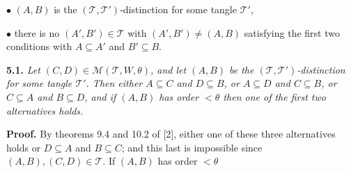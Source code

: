 \hspace*{12pt}$\bullet$ $(A, B)$ is the $(\mathcal{T}, \mathcal{T}')$-distinction for some tangle $\mathcal{T}'$,

\hspace*{12pt}$\bullet$ there is no $(A', B') \in \mathcal{T}$ with $(A', B') \ne (A, B)$ satisfying the first two conditions with $A \subseteq A'$ and $B' \subseteq B$.

\textbf{5.1.} \textit{Let $(C, D) \in \mathcal{M}(\mathcal{T}, W, \theta)$, and let $(A, B)$ be the $(\mathcal{T}, \mathcal{T}')$-distinction for some tangle $\mathcal{T}'$. Then either $A \subseteq C$ and $D \subseteq B$, or $A \subseteq D$ and $C \subseteq B$, or $C \subseteq A$ and $B \subseteq D$, and if $(A, B)$ has order $< \theta$ then one of the first two alternatives holds.}

\textbf{Proof.} By theorems 9.4 and 10.2 of [2], either one of these three alternatives holds or $D \subseteq A$ and $B \subseteq C$; and this last is impossible since $(A, B), (C, D) \in \mathcal{T}$. If $(A, B)$ has order $< \theta$
